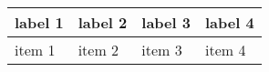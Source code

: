 \documentclass{article}
\begin{document}
\begin{tabularx}{\textwidth}{ |X|X|X|X| }
  \hline
  label 1 & label 2 & label 3 & label 4 \\
  \hline 
  item 1  & item 2  & item 3  & item 4  \\
  \hline
\end{tabularx}
\end{document}
